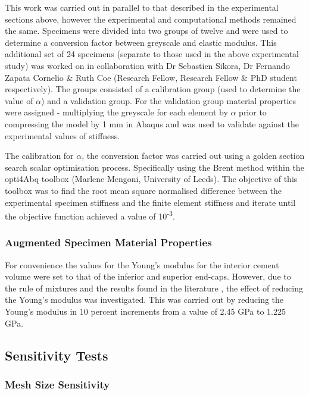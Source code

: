 This work was carried out in parallel to that described in the experimental sections above, however the experimental and computational methods remained the same. Specimens were divided into two groups of twelve  and were used to determine a conversion factor between greyscale and elastic modulus. This additional set of 24 specimens (separate to
those used in the above experimental study) was worked on in collaboration with Dr Sebastien Sikora, Dr Fernando Zapata Cornelio \& Ruth Coe (Research Fellow, Research Fellow \& PhD student respectively).
The groups consisted of a calibration group (used to determine the value of $\alpha$) and a validation group. For the validation group material properties were assigned - multiplying the greyscale
for each element by \(\alpha\) prior to compressing the model by 1 mm in
Abaqus and was used to validate against the experimental values of stiffness.

The calibration for \(\alpha\), the conversion factor was carried out
using a golden section search scalar optimisation process. Specifically
using the Brent method within the opti4Abq toolbox (Marlene Mengoni, University of Leeds). The objective of this toolbox was to find the root mean
square normalised difference between the experimental specimen stiffness
and the finite element stiffness and iterate until the objective
function achieved a value of 10\textsuperscript{-3}.

\subsubsection{Augmented Specimen Material
Properties}\label{augmented-specimen-material-properties}


For convenience the values for the Young's modulus for the interior cement volume were set to that of the inferior and superior end-caps. However, due to the rule of mixtures and the results found in the literature \cite{Kinzl2012a,Race2007}, the effect of reducing the Young's modulus was investigated. This was carried out by reducing the Young's modulus in 10 percent increments from a value of 2.45 GPa to 1.225 GPa.


\subsection{Sensitivity Tests}\label{sensitivity-tests}

\subsubsection{Mesh Size Sensitivity}\label{mesh-size-sensitivity}

